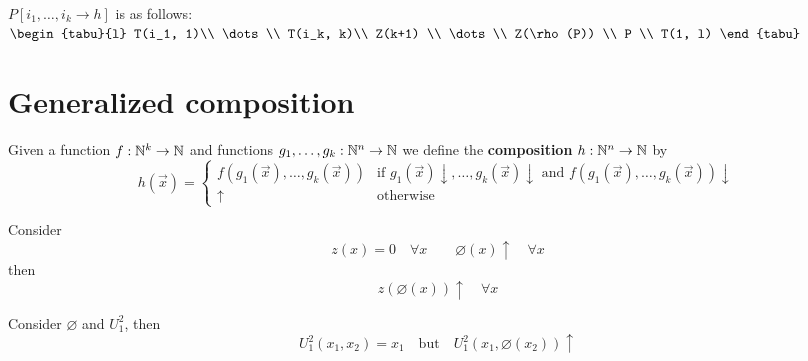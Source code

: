 $P[i_1,\dots,i_k \rightarrow h]$ is as follows:\\

$\begin{tabu}{l}
  T(i_1, 1)\\
  \dots    \\     
  T(i_k, k)\\          
  Z(k+1) \\
  \dots  \\
  Z(\rho(P))     \\     
  P \\
  T(1, l)
\end{tabu}$

\section {Generalized composition}
\begin{definition}
  Given a function
$f: \mathbb{N}^k \rightarrow \mathbb{N}$ and functions
$g_1,\dots,g_k: \mathbb{N}^n \rightarrow \mathbb{N}$
we define the \textbf{composition} $h: \mathbb{N}^n \rightarrow \mathbb{N}$ by 
  \begin{equation*}
    h(\vec{x}) = \begin{cases}
      f(g_1(\vec{x}), \dots, g_k(\vec{x})) & \mbox{if } g_1(\vec{x})\downarrow, \dots, g_k(\vec{x})\downarrow \mbox{ and } f(g_1(\vec{x}), \dots, g_k(\vec{x}))\downarrow\\
      \uparrow & \mbox{otherwise}
    \end{cases}
  \end{equation*}
\end{definition}

\begin{example}
  Consider
  \begin{equation*}
    z(x)=0\quad \forall x \qquad \varnothing(x)\uparrow\quad \forall x
  \end{equation*}
  then
  \begin{equation*}
    z(\varnothing(x))\uparrow \quad \forall x
  \end{equation*}
\end{example}

\begin{example}
  Consider $\varnothing$ and $U^2_1$, then
  \begin{equation*}
    U^2_1(x_1, x_2)=x_1 \quad \text{but} \quad U^2_1(x_1, \varnothing(x_2))\uparrow
  \end{equation*}
\end{example}


